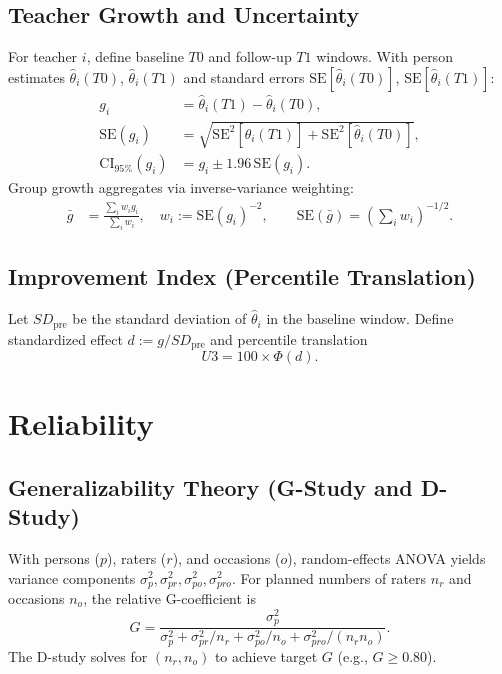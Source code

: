 \documentclass[11pt]{article}
\newcommand{\SE}{\mathrm{SE}}
\begin{document}
\subsection{Teacher Growth and Uncertainty}
For teacher $i$, define baseline $T0$ and follow-up $T1$ windows. With person estimates $\widehat{\theta}_i(T0)$, $\widehat{\theta}_i(T1)$ and standard errors $\SE[\widehat{\theta}_i(T0)]$, $\SE[\widehat{\theta}_i(T1)]$:
\begin{align}
g_i &= \widehat{\theta}_i(T1) - \widehat{\theta}_i(T0),\\
\SE(g_i) &= \sqrt{\SE^2[\widehat{\theta}_i(T1)] + \SE^2[\widehat{\theta}_i(T0)]},\\
\mathrm{CI}_{95\%}(g_i) &= g_i \pm 1.96\, \SE(g_i).
\end{align}
Group growth aggregates via inverse-variance weighting:
\begin{align}
\bar{g} &= \frac{\sum_i w_i g_i}{\sum_i w_i}, \quad w_i := \SE(g_i)^{-2}, \qquad 
\SE(\bar{g}) = \left(\sum_i w_i\right)^{-1/2}.
\end{align}

\subsection{Improvement Index (Percentile Translation)}
Let $SD_{\mathrm{pre}}$ be the standard deviation of $\widehat{\theta}_i$ in the baseline window. Define standardized effect $d := g/SD_{\mathrm{pre}}$ and percentile translation
\begin{equation}
U3 = 100 \times \Phi(d).
\end{equation}

\section{Reliability}
\subsection{Generalizability Theory (G-Study and D-Study)}
With persons ($p$), raters ($r$), and occasions ($o$), random-effects ANOVA yields variance components $\sigma^2_p, \sigma^2_{pr}, \sigma^2_{po}, \sigma^2_{pro}$. For planned numbers of raters $n_r$ and occasions $n_o$, the relative G-coefficient is
\begin{equation}
G = \frac{\sigma^2_p}{\sigma^2_p + \sigma^2_{pr}/n_r + \sigma^2_{po}/n_o + \sigma^2_{pro}/(n_r n_o)}.
\end{equation}
The D-study solves for $(n_r, n_o)$ to achieve target $G$ (e.g., $G \ge 0.80$).
\end{document}
